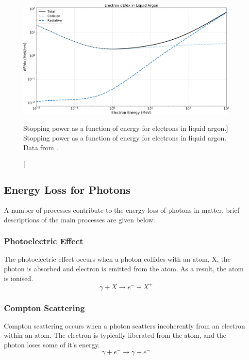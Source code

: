 \begin{figure}

	\centering

	\includegraphics[width=\textwidth]{figures/electron_dedx_argon.pdf}

	\caption
	[Stopping power as a function of energy for electrons in liquid argon.]
	{Stopping power as a function of energy for electrons in liquid argon. Data
		from \cite{estar}.}

	\label{fig:electron_dedx}

\end{figure}

\subsection{Energy Loss for Photons}
A number of processes contribute to the energy loss of photons in matter, brief 
descriptions of the main processes are given below.

\subsubsection*{Photoelectric Effect}
The photoelectric effect occurs when a photon collides with an atom, X, the
photon is absorbed and electron is emitted from the atom. As a result, the atom 
is ionised. 
\begin{equation*}
	\gamma + X \rightarrow e^- + X^+
\end{equation*}

\subsubsection*{Compton Scattering}
Compton scattering occurs when a photon scatters incoherently from an electron
within an atom. The electron is typically liberated from the atom, and the
photon loses some of it's energy.
\begin{equation*}
	\gamma + e^- \rightarrow \gamma + e^-
\end{equation*}

